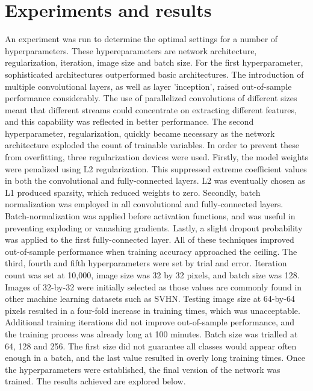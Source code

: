 \documentclass[fleqn,10pt]{SelfArx} %
\begin{document}
\section{Experiments and results}
An experiment was run to determine the optimal settings for a number of hyperparameters. These hypereparameters are network architecture, regularization, iteration, image size and batch size.
\newline
For the first hyperparameter, sophisticated architectures outperformed basic architectures. The introduction of multiple convolutional layers, as well as layer 'inception', raised out-of-sample performance considerably. The use of parallelized convolutions of different sizes meant that different streams could concentrate on extracting different features, and this capability was reflected in better performance.
\newline
The second hyperparameter, regularization, quickly became necessary as the network architecture exploded the count of trainable variables. In order to prevent these from overfitting, three regularization devices were used. Firstly, the model weights were penalized using L2 regularization. This suppressed extreme coefficient values in both the convolutional and fully-connected layers. L2 was eventually chosen as L1 produced sparsity, which reduced weights to zero. Secondly, batch normalization was employed in all convolutional and fully-connected layers. Batch-normalization was applied before activation functions, and was useful in preventing exploding or vanashing gradients. Lastly, a slight dropout probability was applied to the first fully-connected layer. All of these techniques improved out-of-sample performance when training accuracy approached the ceiling.
\newline
The third, fourth and fifth hyperparameters were set by trial and error. Iteration count was set at 10,000, image size was 32 by 32 pixels, and batch size was 128. Images of 32-by-32 were initially selected as those values are commonly found in other machine learning datasets such as SVHN. Testing image size at 64-by-64 pixels resulted in a four-fold increase in training times, which was unacceptable. Additional training iterations did not improve out-of-sample performance, and the training process was already long at 100 minutes. Batch size was trialled at 64, 128 and 256. The first size did not guarantee all classes would appear often enough in a batch, and the last value resulted in overly long training times.
\newline
Once the hyperparameters were established, the final version of the network was trained. The results achieved are explored below.
\end{document}
